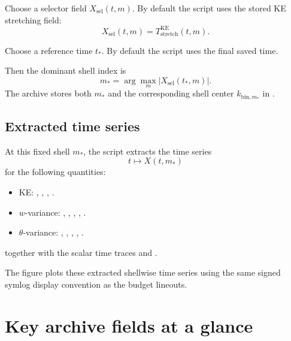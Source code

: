 \documentclass[11pt]{article}
\begin{document}
Choose a selector field \(X_{\mathrm{sel}}(t,m)\). By default the script uses
the stored KE stretching field:
\[
X_{\mathrm{sel}}(t,m) = T^{\mathrm{KE}}_{\mathrm{stretch}}(t,m).
\]

Choose a reference time \(t_{\ast}\). By default the script uses the final saved
time.

Then the dominant shell index is
\[
m_{\ast}
=
\arg\max_m |X_{\mathrm{sel}}(t_{\ast},m)|.
\]
The archive stores both \(m_{\ast}\) and the corresponding shell center
\(k_{\mathrm{bin},m_{\ast}}\) in
.

\subsection{Extracted time series}

At this fixed shell \(m_{\ast}\), the script extracts the time series
\[
t \mapsto X(t,m_{\ast})
\]
for the following quantities:
\begin{itemize}
\item KE: , , , .
\item \(w\)-variance: , , ,
  , .
\item \(\theta\)-variance: , ,
  , , .
\end{itemize}
together with the scalar time traces  and .

The figure  plots these extracted shellwise
time series using the same signed symlog display convention as the budget
lineouts.

\section{Key archive fields at a glance}
\end{document}
